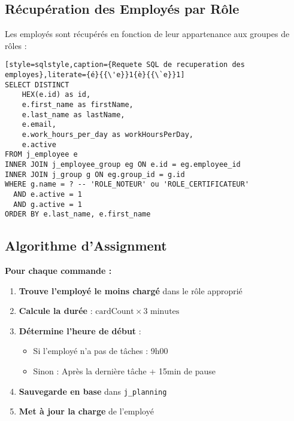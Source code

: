 \documentclass[11pt,a4paper]{article}
\begin{document}
    \subsection{Récupération des Employés par Rôle}

    Les employés sont récupérés en fonction de leur appartenance aux groupes de rôles :

    \begin{lstlisting}[style=sqlstyle,caption={Requete SQL de recuperation des employes},literate={é}{{\'e}}1{è}{{\`e}}1]
SELECT DISTINCT
    HEX(e.id) as id,
    e.first_name as firstName,
    e.last_name as lastName,
    e.email,
    e.work_hours_per_day as workHoursPerDay,
    e.active
FROM j_employee e
INNER JOIN j_employee_group eg ON e.id = eg.employee_id
INNER JOIN j_group g ON eg.group_id = g.id
WHERE g.name = ? -- 'ROLE_NOTEUR' ou 'ROLE_CERTIFICATEUR'
  AND e.active = 1
  AND g.active = 1
ORDER BY e.last_name, e.first_name
    \end{lstlisting}

    \subsection{Algorithme d'Assignment}

    \begin{tcolorbox}[colback=infobox,colframe=blue!50!black,title=\textbf{Algorithme d'Assignment Intelligent}]
        \textbf{Pour chaque commande :}
        \begin{enumerate}
            \item \textbf{Trouve l'employé le moins chargé} dans le rôle approprié
            \item \textbf{Calcule la durée} : $\text{cardCount} \times 3 \text{ minutes}$
            \item \textbf{Détermine l'heure de début} :
            \begin{itemize}
                \item Si l'employé n'a pas de tâches : 9h00
                \item Sinon : Après la dernière tâche + 15min de pause
            \end{itemize}
            \item \textbf{Sauvegarde en base} dans \texttt{j\_planning}
            \item \textbf{Met à jour la charge} de l'employé
        \end{enumerate}
    \end{tcolorbox}
\end{document}
